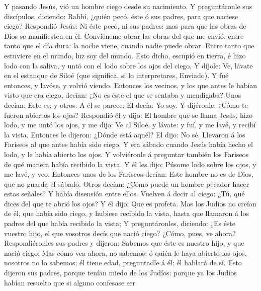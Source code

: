  Y pasando Jesús, vió un hombre ciego desde su nacimiento.
 Y preguntáronle sus discípulos, diciendo: Rabbí, ¿quién
pecó, éste ó sus padres, para que naciese ciego? 
Respondió Jesús: Ni éste pecó, ni sus padres: mas para que las obras de
Dios se manifiesten en él.  Conviéneme obrar las obras del
que me envió, entre tanto que el día dura: la noche viene, cuando nadie
puede obrar.  Entre tanto que estuviere en el mundo, luz
soy del mundo.  Esto dicho, escupió en tierra, é hizo lodo
con la saliva, y untó con el lodo sobre los ojos del ciego,
 Y díjole: Ve, lávate en el estanque de Siloé (que
significa, si lo interpretares, Enviado). Y fué entonces, y lavóse, y
volvió viendo.  Entonces los vecinos, y los que antes le
habían visto que era ciego, decían: ¿No es éste el que se sentaba y
mendigaba?  Unos decían: Este es; y otros: A él se parece.
El decía: Yo soy.  Y dijéronle: ¿Cómo te fueron abiertos
los ojos?  Respondió él y dijo: El hombre que se llama
Jesús, hizo lodo, y me untó los ojos, y me dijo: Ve al Siloé, y lávate:
y fuí, y me lavé, y recibí la vista.  Entonces le
dijeron: ¿Dónde está aquél? El dijo: No sé.  Llevaron á
los Fariseos al que antes había sido ciego.  Y era sábado
cuando Jesús había hecho el lodo, y le había abierto los ojos.
 Y volviéronle á preguntar también los Fariseos de qué
manera había recibido la vista. Y él les dijo: Púsome lodo sobre los
ojos, y me lavé, y veo.  Entonces unos de los Fariseos
decían: Este hombre no es de Dios, que no guarda el sábado. Otros
decían: ¿Cómo puede un hombre pecador hacer estas señales? Y había
disensión entre ellos.  Vuelven á decir al ciego: ¿Tú,
qué dices del que te abrió los ojos? Y él dijo: Que es profeta.
 Mas los Judíos no creían de él, que había sido ciego, y
hubiese recibido la vista, hasta que llamaron á los padres del que había
recibido la vista;  Y preguntáronles, diciendo: ¿Es éste
vuestro hijo, el que vosotros decís que nació ciego? ¿Cómo, pues, ve
ahora?  Respondiéronles sus padres y dijeron: Sabemos que
éste es nuestro hijo, y que nació ciego:  Mas cómo vea
ahora, no sabemos; ó quién le haya abierto los ojos, nosotros no lo
sabemos; él tiene edad, preguntadle á él; él hablará de sí.
 Esto dijeron sus padres, porque tenían miedo de los
Judíos: porque ya los Judíos habían resuelto que si alguno confesase ser

